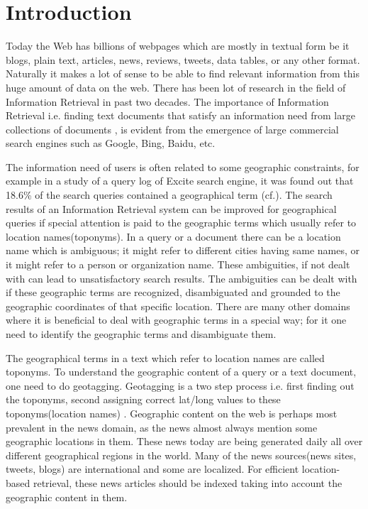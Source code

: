 \documentclass[
     11pt,         %
     a4paper,      %
     oneside,
     ]{article}
\begin{document}
\tableofcontents
\newpage





\section{Introduction}\label{sec:introduction}
Today the Web has billions of webpages which are mostly in textual form be it blogs, plain text, articles, news, reviews, tweets, data tables, or any other format. Naturally it makes a lot of sense to be able to find relevant information from this huge amount of data on the web. There has been lot of research in the field of Information Retrieval in past two decades. The importance of Information Retrieval i.e. finding text documents that satisfy an information need from large collections of documents \cite{Manning:2008:IIR:1394399}, is evident from the emergence of large commercial search engines such as Google, Bing, Baidu, etc.

The information need of users is often related to some geographic constraints, for example in a study of a query log of Excite search engine, it was found out that 18.6\% of the search queries contained a geographical term \cite{Sanderson04analyzinggeographic} (cf.\cite{Leidner:2008:PhD}). The search results of an Information Retrieval system can be improved for geographical queries if special attention is paid to the geographic terms which usually refer to location names(toponyms). In a query or a document there can be a location name which is ambiguous; it might refer to different cities having same names, or it might refer to a person or organization name. These ambiguities, if not dealt with can lead to unsatisfactory search results. The ambiguities can be dealt with if these geographic terms are recognized, disambiguated and grounded to the geographic coordinates of that specific location. There are many other domains where it is beneficial to deal with geographic terms in a special way; for it one need to identify the geographic terms and disambiguate them. 


The geographical terms in a text which refer to location names are called toponyms. To understand the geographic content of a query or a text document, one need to do geotagging. Geotagging is a two step process i.e. first finding out the toponyms, second assigning correct lat/long values to these toponyms(location names) \cite{Lieberman12adaptivecontext}. Geographic content on the web is perhaps most prevalent in the news domain, as the news almost always mention some geographic locations in them. These news today are being generated daily all over different geographical regions in the world. Many of the news sources(news sites, tweets, blogs) are international and some are localized. For efficient location-based retrieval, these news articles should be indexed taking into account the geographic content in them.
\end{document}
